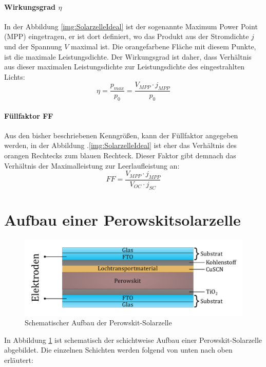 \documentclass[12pt,a4paper,ngerman]{report}
\begin{document}
	\paragraph{Wirkungsgrad $\eta$}
	In der Abbildung \ref{img:SolarzelleIdeal} ist der sogenannte Maximum Power Point (MPP) eingetragen, er ist dort definiert, wo das Produkt aus der Stromdichte $j$ und der Spannung $V$ maximal ist. Die orangefarbene Fläche mit diesem Punkte, ist die maximale Leistungsdichte. Der Wirkungsgrad ist daher, dass Verhältnis aus dieser maximalen Leistungsdichte zur Leistungsdichte des eingestrahlten Lichts:
	\begin{equation}
		\eta = \frac{p_{max}}{p_0} = \frac{V_{MPP} \cdot j_{MPP}}{p_0}
	\end{equation}
	\paragraph{Füllfaktor FF}
	Aus den bisher beschriebenen Kenngrößen, kann der Füllfaktor angegeben werden, in der Abbildung .\ref{img:SolarzelleIdeal} ist eher das Verhältnis des orangen Rechtecks zum blauen Rechteck. Dieser Faktor gibt demnach das Verhältnis der Maximalleistung zur Leerlaufleistung an:
	\begin{equation}
		FF = \frac{V_{MPP} \cdot j_{MPP}}{V_{OC} \cdot j_{SC}}
	\end{equation}  

	\section{Aufbau einer Perowskitsolarzelle}
		\begin{figure}[ht]
		\centering
		\includegraphics[width=\textwidth]{Bilder/AufbauZelle.pdf}		
		\caption[Aufbau der Perowskit-Solarzelle]{Schematischer Aufbau der Perowskit-Solarzelle}
		\label{img:AufbauZelle}
	\end{figure}
	In Abbildung \ref{img:AufbauZelle} ist schematisch der schichtweise Aufbau einer Perowskit-Solarzelle abgebildet. Die einzelnen Schichten werden folgend von unten nach oben erläutert:
\end{document}
